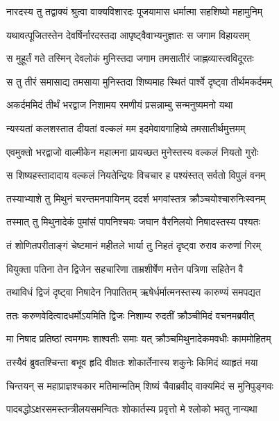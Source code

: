 
\twolineshloka
{नारदस्य तु तद्वाक्यं श्रुत्वा वाक्यविशारदः}
{पूजयामास धर्मात्मा सहशिष्यो महामुनिम्} %

\twolineshloka
{यथावत्पूजितस्तेन देवर्षिर्नारदस्तदा}
{आपृष्ट्वैवाभ्यनुज्ञातः स जगाम विहायसम्} %

\twolineshloka
{स मुहूर्तं गते तस्मिन् देवलोकं मुनिस्तदा}
{जगाम तमसातीरं जाह्नव्यास्त्वविदूरतः} %

\twolineshloka
{स तु तीरं समासाद्य तमसाया मुनिस्तदा}
{शिष्यमाह स्थितं पार्श्वे दृष्ट्वा तीर्थमकर्दमम्} %

\twolineshloka
{अकर्दममिदं तीर्थं भरद्वाज निशामय}
{रमणीयं प्रसन्नाम्बु सन्मनुष्यमनो यथा} %

\twolineshloka
{न्यस्यतां कलशस्तात दीयतां वल्कलं मम}
{इदमेवावगाहिष्ये तमसातीर्थमुत्तमम्} %

\twolineshloka
{एवमुक्तो भरद्वाजो वाल्मीकेन महात्मना}
{प्रायच्छत मुनेस्तस्य वल्कलं नियतो गुरोः} %

\twolineshloka
{स शिष्यहस्तादादाय वल्कलं नियतेन्द्रियः}
{विचचार ह पश्यंस्तत् सर्वतो विपुलं वनम्} %

\twolineshloka
{तस्याभ्याशे तु मिथुनं चरन्तमनपायिनम्}
{ददर्श भगवांस्तत्र क्रौञ्चयोश्चारुनिःस्वनम्} %

\twolineshloka
{तस्मात् तु मिथुनादेकं पुमांसं पापनिश्चयः}
{जघान वैरनिलयो निषादस्तस्य पश्यतः} %

\twolineshloka
{तं शोणितपरीताङ्गं चेष्टमानं महीतले}
{भार्या तु निहतं दृष्ट्वा रुराव करुणां गिरम्} %

\twolineshloka
{वियुक्ता पतिना तेन द्विजेन सहचारिणा}
{ताम्रशीर्षेण मत्तेन पत्रिणा सहितेन वै} %

\twolineshloka
{तथाविधं द्विजं दृष्ट्वा निषादेन निपातितम्}
{ऋषेर्धर्मात्मनस्तस्य कारुण्यं समपद्यत} %

\twolineshloka
{ततः करुणवेदित्वादधर्मोऽयमिति द्विजः}
{निशाम्य रुदतीं क्रौञ्चीमिदं वचनमब्रवीत्} %

\twolineshloka
{मा निषाद प्रतिष्ठां त्वमगमः शाश्वतीः समाः}
{यत् क्रौञ्चमिथुनादेकमवधीः काममोहितम्} %

\twolineshloka
{तस्यैवं ब्रुवतश्चिन्ता बभूव हृदि वीक्षतः}
{शोकार्तेनास्य शकुनेः किमिदं व्याहृतं मया} %

\twolineshloka
{चिन्तयन् स महाप्राज्ञश्चकार मतिमान्मतिम्}
{शिष्यं चैवाब्रवीद् वाक्यमिदं स मुनिपुङ्गवः} %

\twolineshloka
{पादबद्धोऽक्षरसमस्तन्त्रीलयसमन्वितः}
{शोकार्तस्य प्रवृत्तो मे श्लोको भवतु नान्यथा} %

